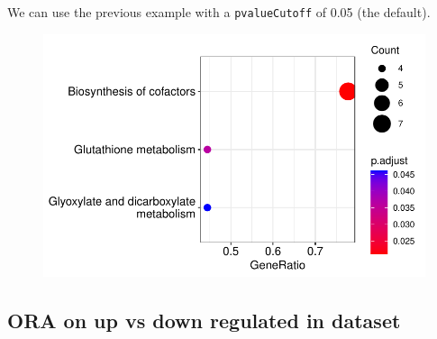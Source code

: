 \documentclass[
  24px,
  letterpaper,
  DIV=11,
  numbers=noendperiod]{scrartcl}
\newenvironment{Shaded}{\begin{snugshade}}{\end{snugshade}}
\newcommand{\AttributeTok}[1]{\textcolor[rgb]{0.40,0.45,0.13}{#1}}
\newcommand{\DecValTok}[1]{\textcolor[rgb]{0.68,0.00,0.00}{#1}}
\newcommand{\FloatTok}[1]{\textcolor[rgb]{0.68,0.00,0.00}{#1}}
\newcommand{\FunctionTok}[1]{\textcolor[rgb]{0.28,0.35,0.67}{#1}}
\newcommand{\NormalTok}[1]{\textcolor[rgb]{0.00,0.23,0.31}{#1}}
\newcommand{\OtherTok}[1]{\textcolor[rgb]{0.00,0.23,0.31}{#1}}
\newcommand{\SpecialCharTok}[1]{\textcolor[rgb]{0.37,0.37,0.37}{#1}}
\begin{document}
We can use the previous example with a \texttt{pvalueCutoff} of 0.05
(the default).

\begin{Shaded}
\end{Shaded}

\begin{figure}[H]

{\centering \includegraphics{index_files/figure-pdf/unnamed-chunk-28-1.pdf}

}

\end{figure}

\hypertarget{ora-on-up-vs-down-regulated-in-dataset}{%
\subsection{ORA on up vs down regulated in
dataset}\label{ora-on-up-vs-down-regulated-in-dataset}}
\end{document}
